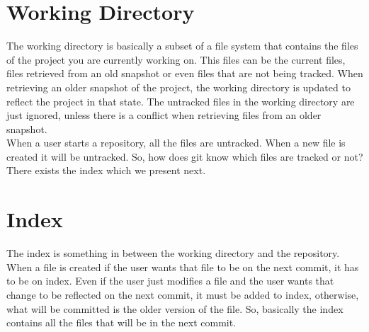 \section{Working Directory}

The working directory is basically a subset of
a file system that contains the files of the project you are
currently working on. This files can be the current files, files
retrieved from an old snapshot or even files that are not being
tracked. When retrieving an older snapshot of the project, the
working directory is updated to reflect the project in that state. The
untracked files in the working directory are just ignored, unless
there is a conflict when retrieving files from an older snapshot.\\

When a user starts a repository, all the files are untracked. When a
new file is created it will be untracked. So, how does git know which
files are tracked or not? There exists the index which we present
next.

\section{Index}
The index is something in between the working directory and the
repository. When a file is created if the user wants that file to be
on the next commit, it has to be on index. Even if the user just
modifies a file and the user wants that change to be reflected on the
next commit, it must be added to index, otherwise, what will be
committed is the older version of the file. So, basically the index
contains all the files that will be in the next commit.\\

